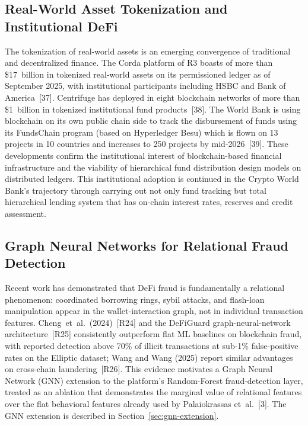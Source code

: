 \documentclass[12pt,a4paper]{report}
\begin{document}
\subsection{Real-World Asset Tokenization and Institutional DeFi}

The tokenization of real-world assets is an emerging convergence of traditional and decentralized finance. The Corda platform of R3 boasts of more than \$17~billion in tokenized real-world assets on its permissioned ledger as of September 2025, with institutional participants including HSBC and Bank of America~[37]. Centrifuge has deployed in eight blockchain networks of more than \$1~billion in tokenized institutional fund products~[38]. The World Bank is using blockchain on its own public chain side to track the disbursement of funds using its FundsChain program (based on Hyperledger Besu) which is flown on 13 projects in 10 countries and increases to 250 projects by mid-2026~[39]. These developments confirm the institutional interest of blockchain-based financial infrastructure and the viability of hierarchical fund distribution design models on distributed ledgers. This institutional adoption is continued in the Crypto World Bank's trajectory through carrying out not only fund tracking but total hierarchical lending system that has on-chain interest rates, reserves and credit assessment.

\subsection{Graph Neural Networks for Relational Fraud Detection}
\label{sec:lit-gnn}

Recent work has demonstrated that DeFi fraud is fundamentally a relational phenomenon: coordinated borrowing rings, sybil attacks, and flash-loan manipulation appear in the wallet-interaction graph, not in individual transaction features. Cheng~et~al.~(2024)~[R24] and the DeFiGuard graph-neural-network architecture~[R25] consistently outperform flat ML baselines on blockchain fraud, with reported detection above 70\% of illicit transactions at sub-1\% false-positive rates on the Elliptic dataset; Wang and Wang (2025) report similar advantages on cross-chain laundering~[R26]. This evidence motivates a Graph Neural Network (GNN) extension to the platform's Random-Forest fraud-detection layer, treated as an ablation that demonstrates the marginal value of relational features over the flat behavioral features already used by Palaiokrassas et~al.~[3]. The GNN extension is described in Section~\ref{sec:gnn-extension}.
\end{document}
